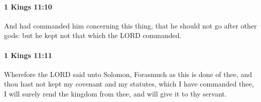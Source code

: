 		\paragraph{1 Kings 11:10} %
			\label{1KINGS-11-10}

			And had commanded him concerning this thing, that he should not go after other gods: but he kept not that which the LORD commanded.


		\paragraph{1 Kings 11:11} %
			\label{1KINGS-11-11}

			Wherefore the LORD said unto Solomon, Forasmuch as this is done of thee, and thou hast not kept my covenant and my statutes, which I have commanded thee, I will surely rend the kingdom from thee, and will give it to thy servant.


